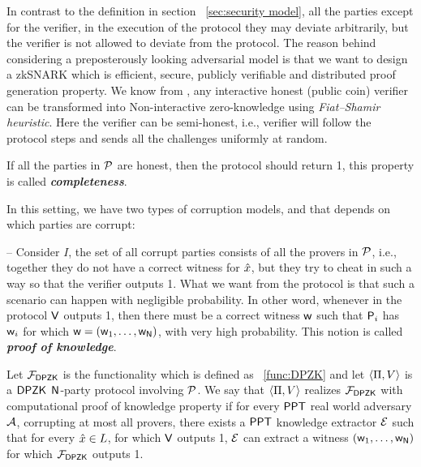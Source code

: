 In contrast to the definition in section ~\ref{sec:security model}, all the parties except for the verifier, in the execution of the protocol they may deviate arbitrarily, but the verifier is not allowed to deviate from the protocol. The reason behind considering a preposterously looking adversarial model is that we want to design a zkSNARK which is efficient, secure, publicly verifiable and distributed proof generation property. We know from \cite{}, any interactive honest (public coin) verifier can be transformed into Non-interactive zero-knowledge using \textit{Fiat–Shamir heuristic}. Here the verifier can be semi-honest, i.e., verifier will follow the protocol steps and sends all the challenges uniformly at random.

If all the parties in $\mathcal{P}$ are honest, then the protocol should return 1, this property is called \textbf{\textit{completeness}}.

In this setting, we have two types of corruption models, and that depends on which parties are corrupt:

-- Consider $I$, the set of all corrupt parties consists of all the provers in $\mathcal{P}$, i.e., together they do not have a correct witness for $\hat{x}$, but they try to cheat in such a way so that the verifier outputs 1. What we want from the protocol is that such a scenario can happen with negligible probability. In other word, whenever in the protocol $\mathsf{V}$ outputs 1, then there must be a correct witness $\mathsf{w}$ such that $\mathsf{P}_i$ has $\mathsf{w}_i$ for which $\mathsf{w} = (\mathsf{w}_1, \ldots, \mathsf{w}_{\mathsf{N}})$, with very high probability. This notion is called \textbf{\textit{proof of knowledge}}. 
	\begin{definition}
		Let $\mathcal{F}_{\mathsf{DPZK}}$ is the functionality which is defined as ~\ref{func:DPZK} and let $\langle \Pi,V\rangle$ is a $\mathsf{DPZK}$ $\mathsf{N}$-party protocol involving $\mathcal{P}$. We say that $\langle \Pi,V\rangle$ realizes $\mathcal{F}_{\mathsf{DPZK}}$ with computational proof of knowledge property if for every $\mathsf{PPT}$ real world adversary $\mathcal{A}$, corrupting at most all provers, there exists a $\mathsf{PPT}$ knowledge extractor $\mathcal{E}$ such that for every $\hat{x} \in L$, for which $\mathsf{V}$ outputs 1, $\mathcal{E}$ can extract a witness $(\mathsf{w}_1, \ldots, \mathsf{w}_{\mathsf{N}})$ for which $\mathcal{F}_{\mathsf{DPZK}}$ outputs 1.
	\end{definition}    
	
